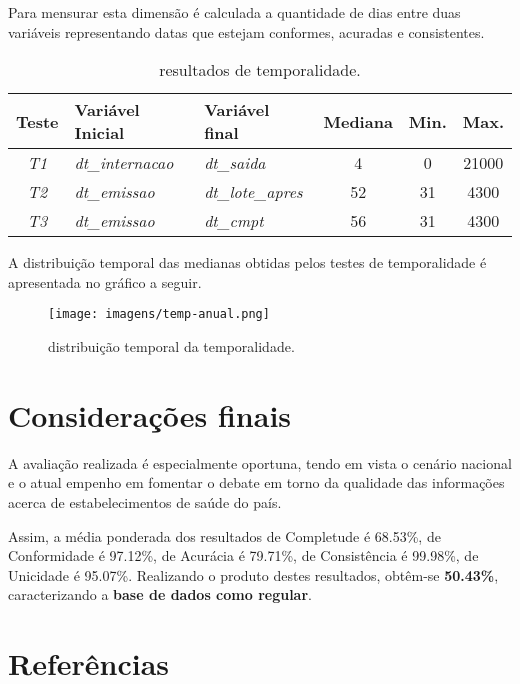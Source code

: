 \documentclass[
  12,
  table]{proadi}
\begin{document}
Para mensurar esta dimensão é calculada a quantidade de dias entre duas
variáveis representando datas que estejam conformes, acuradas e
consistentes.

\begin{table}[H]

\caption{\label{tab:unnamed-chunk-20}resultados de temporalidade.}
\centering
\fontsize{10}{12}\selectfont
\begin{tabular}[t]{>{}c>{}l>{}lccc}
\toprule
Teste & Variável Inicial & Variável final & Mediana & Min. & Max.\\
\midrule
\em{T1} & \em{dt\_internacao} & \em{dt\_saida} & 4 & 0 & 21000\\
\em{T2} & \em{dt\_emissao} & \em{dt\_lote\_apres} & 52 & 31 & 4300\\
\em{T3} & \em{dt\_emissao} & \em{dt\_cmpt} & 56 & 31 & 4300\\
\bottomrule
\end{tabular}
\end{table}

A distribuição temporal das medianas obtidas pelos testes de
temporalidade é apresentada no gráfico a seguir.

\begin{figure}
\centering
\texttt{[image: imagens/temp-anual.png]}
\caption{distribuição temporal da temporalidade.}
\end{figure}

\hypertarget{considerauxe7uxf5es-finais}{%
\section{Considerações finais}\label{considerauxe7uxf5es-finais}}

A avaliação realizada é especialmente oportuna, tendo em vista o cenário
nacional e o atual empenho em fomentar o debate em torno da qualidade
das informações acerca de estabelecimentos de saúde do país.

Assim, a média ponderada dos resultados de Completude é 68.53\%, de
Conformidade é 97.12\%, de Acurácia é 79.71\%, de Consistência é
99.98\%, de Unicidade é 95.07\%. Realizando o produto destes resultados,
obtêm-se \textbf{50.43\%}, caracterizando a \textbf{base de dados como
regular}.

\newpage

\hypertarget{referuxeancias}{%
\section{Referências}\label{referuxeancias}}
\end{document}
